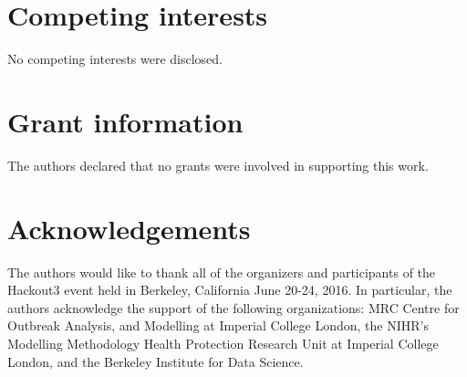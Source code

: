 \documentclass[9pt,a4paper,]{extarticle}
\theoremstyle{definition}
\theoremstyle{definition}
\theoremstyle{definition}
\theoremstyle{remark}
\begin{document}
\section{Competing interests}\label{competing-interests}

No competing interests were disclosed.

\section{Grant information}\label{grant-information}

The authors declared that no grants were involved in supporting this work.

\section{Acknowledgements}\label{acknowledgements}

The authors would like to thank all of the organizers and participants of the Hackout3 event held in Berkeley, California June 20-24, 2016. In particular, the authors acknowledge the support of the following organizations: MRC Centre for Outbreak Analysis, and Modelling at Imperial College London, the NIHR's Modelling Methodology Health Protection Research Unit at Imperial College London, and the Berkeley Institute for Data Science.

{\small}
\end{document}
